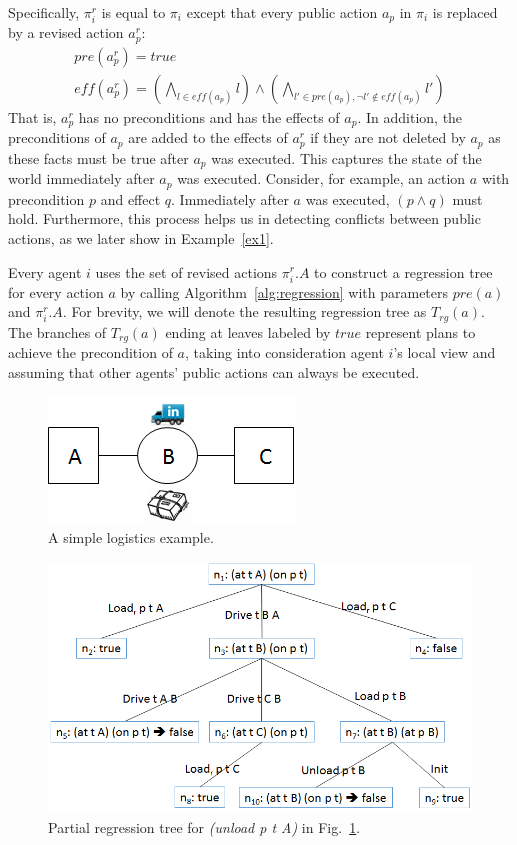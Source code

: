 \documentclass[letterpaper]{article}
\newcommand{\eff}{\textit{eff}}
\newcommand{\pre}{\textit{pre}}
\theoremstyle{definition}
\begin{document}
Specifically, $\pi_i^r$ is equal to $\pi_i$ except that every public action $a_p$ in $\pi_i$ is replaced by a revised action $a^r_p$:
\begin{eqnarray}
& \pre(a^r_p)=true &\\
& \eff(a^r_p)=\displaystyle\left(\bigwedge_{l \in \eff(a_p)}l\right) \wedge \left(\bigwedge_{l' \in \pre(a_p), \neg l' \not\in \eff(a_p)}l'\right)&
\end{eqnarray}
That is, $a^r_p$ has no preconditions and has the effects of $a_p$.
In addition, the preconditions of $a_p$ are added to the effects of $a^r_p$ if they are not deleted by $a_p$ as these facts must be true after $a_p$ was executed.
This captures the state of the world immediately after $a_p$ was executed. Consider, for example, an action $a$ with precondition $p$ and effect $q$. Immediately after $a$ was executed, $(p \wedge q)$ must hold. Furthermore, this process helps us in detecting conflicts between public actions, as we later show in Example~\ref{ex1}.


Every agent $i$ uses the set of revised actions $\pi_i^r.A$ to construct a regression tree for every action $a$ by calling Algorithm~\ref{alg:regression} with parameters $\pre(a)$ and $\pi_i^r.A$. For brevity, we will denote the resulting regression tree as $T_{rg}(a)$. The branches of $T_{rg}(a)$ ending at leaves labeled by $true$ represent plans to achieve the precondition of $a$, taking into consideration agent $i$'s local view and assuming that other agents' public actions can always be executed.





\begin{figure}
\centering
\includegraphics[scale=0.7]{SmallLogistics}
\caption{A simple logistics example.}
\label{fig:small}
\end{figure}


\begin{figure}
\centering
\includegraphics[width=\columnwidth]{RegressionTree}
\caption{Partial regression tree for {\em (unload p t A)} in Fig.~\ref{fig:small}.}
\label{fig:tree}
\end{figure}
\end{document}
